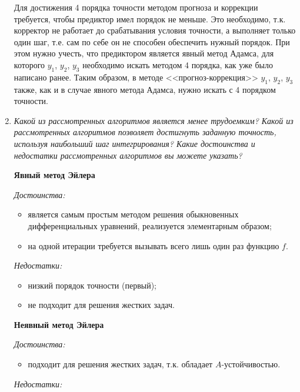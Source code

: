 \documentclass[12pt, a4paper]{article}
\begin{document}
\begin{enumerate}
		
		Для достижения 4 порядка точности методом прогноза и коррекции требуется, чтобы предиктор имел порядок не меньше. Это необходимо, т.к. корректор не работает до срабатывания условия точности, а выполняет только один шаг, т.е. сам по себе он  не способен обеспечить нужный порядок. При этом нужно учесть, что предиктором является явный метод Адамса, для которого $y_1$, $y_2$, $y_3$ необходимо искать методом 4 порядка, как уже было написано ранее. Таким образом, в методе <<прогноз-коррекция>> $y_1$, $y_2$, $y_3$ также, как и в случае явного метода Адамса, нужно искать с 4 порядком точности.
		
		\item \textit{Какой из рассмотренных алгоритмов является менее трудоемким? Какой из рассмотренных алгоритмов позволяет достигнуть заданную точность, используя наибольший	шаг интегрирования? Какие достоинства и недостатки рассмотренных алгоритмов вы можете указать?}
		\smallskip
		
		\textbf{Явный метод Эйлера}
		
		\textit{Достоинства:}
		
		\begin{itemize}
			\item является самым простым методом решения обыкновенных дифференциальных уравнений, реализуется элементарным образом;
			\item на одной итерации требуется вызывать всего лишь один раз функцию $f$.
		\end{itemize}
		
		\textit{Недостатки:}
		
		\begin{itemize}
			\item низкий порядок точности (первый);
			\item не подходит для решения жестких задач.
		\end{itemize}
		
		\textbf{Неявный метод Эйлера}
		
		\textit{Достоинства:}
		
		\begin{itemize}
			\item подходит для решения жестких задач, т.к. обладает $A$-устойчивостью. 
		\end{itemize}
		
		\textit{Недостатки:}
		

\end{enumerate}
\end{document}
